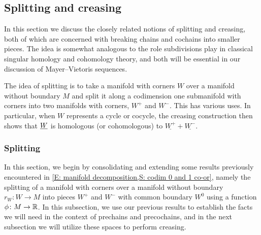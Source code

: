 \begin{comment}
	For the third product, we have by Joyce's convention that \red{I'm not getting a simple description of this because of Joyce's desription.
		Note that it requires using a specific identification of $TV \oplus TW$ with $TP \oplus TM$.
		I compute that even if we use identify $TM = \nu W \oplus TP \oplus \nu V$, $TV = \nu W \oplus TP$, and $TW = TP \oplus \nu V \oplus TP$ consistently, there's a sign of $(-1)^{m-w}$ from the determinant of Joyce's isomorphism, and then he enforces another factor of $(-1)^{mw}$ by hand.
		Yuck.
		And this is before comparing the actual orientations of things - yuck.
		We'll have to think some more about this.
	}.
\end{comment}

\subsection{Splitting and creasing}\label{S: splitting and creasing}

In this section we discuss the closely related notions of splitting and creasing, both of which are concerned with breaking chains and cochains into smaller pieces.
The idea is somewhat analogous to the role subdivisions play in classical singular homology and cohomology theory, and both will be essential in our discussion of Mayer--Vietoris sequences.

The idea of splitting is to take a manifold with corners $W$ over a manifold without boundary $M$ and split it along a codimension one submanifold with corners into two manifolds with corners, $W^+$ and $W^-$.
This has various uses.
In particular, when $W$ represents a cycle or cocycle, the creasing construction then shows that $\underline{W}$ is homologous (or cohomologous) to $\underline{W^+} + \underline{W^-}$.


\subsubsection{Splitting}\label{S: splitting}
In this section, we begin by consolidating and extending some results previously encountered in \cref{E: manifold decomposition,S: codim 0 and 1 co-or}, namely the splitting of a manifold with corners over a manifold without boundary $r_W \colon W \to M$ into pieces $W^+$ and $W^-$ with common boundary $W^0$ using a function $\phi \colon M \to \mathbb{R}$.
In this subsection, we use our previous results to establish the facts we will need in the context of prechains and precochains, and in the next subsection we will utilize these spaces to perform creasing.

